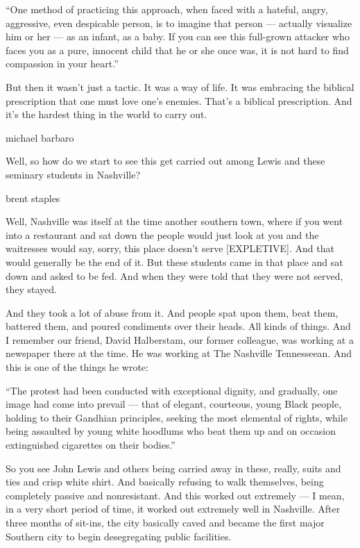 ``One method of practicing this approach, when faced with a hateful,
angry, aggressive, even despicable person, is to imagine that person ---
actually visualize him or her --- as an infant, as a baby. If you can
see this full-grown attacker who faces you as a pure, innocent child
that he or she once was, it is not hard to find compassion in your
heart.''

But then it wasn't just a tactic. It was a way of life. It was embracing
the biblical prescription that one must love one's enemies. That's a
biblical prescription. And it's the hardest thing in the world to carry
out.

michael barbaro

Well, so how do we start to see this get carried out among Lewis and
these seminary students in Nashville?

brent staples

Well, Nashville was itself at the time another southern town, where if
you went into a restaurant and sat down the people would just look at
you and the waitresses would say, sorry, this place doesn't serve
{[}EXPLETIVE{]}. And that would generally be the end of it. But these
students came in that place and sat down and asked to be fed. And when
they were told that they were not served, they stayed.

And they took a lot of abuse from it. And people spat upon them, beat
them, battered them, and poured condiments over their heads. All kinds
of things. And I remember our friend, David Halberstam, our former
colleague, was working at a newspaper there at the time. He was working
at The Nashville Tennesseean. And this is one of the things he wrote:

``The protest had been conducted with exceptional dignity, and
gradually, one image had come into prevail --- that of elegant,
courteous, young Black people, holding to their Gandhian principles,
seeking the most elemental of rights, while being assaulted by young
white hoodlums who beat them up and on occasion extinguished cigarettes
on their bodies.''

So you see John Lewis and others being carried away in these, really,
suits and ties and crisp white shirt. And basically refusing to walk
themselves, being completely passive and nonresistant. And this worked
out extremely --- I mean, in a very short period of time, it worked out
extremely well in Nashville. After three months of sit-ins, the city
basically caved and became the first major Southern city to begin
desegregating public facilities.

